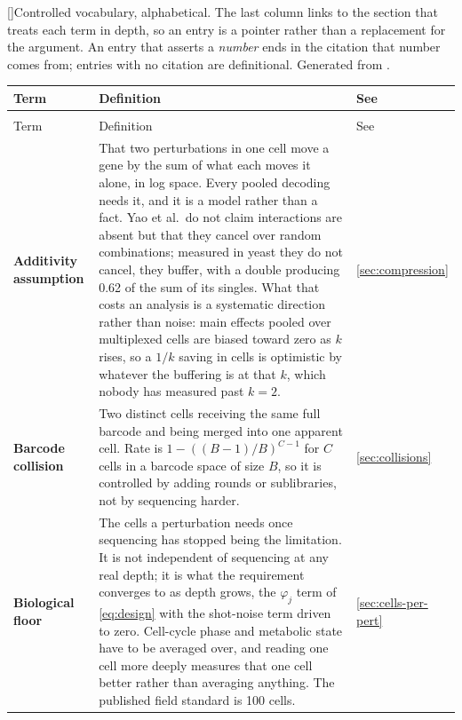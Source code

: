 \begingroup\footnotesize
\setlength{\LTleft}{0pt}\setlength{\LTright}{0pt}
\begingroup\captionsetup{type=table}
[]{Controlled vocabulary, alphabetical. The last column links to the section that treats each term in depth, so an entry is a pointer rather than a replacement for the argument. An entry that asserts a \emph{number} ends in the citation that number comes from; entries with no citation are definitional. Generated from .}\label{tab:glossary}
\endgroup
\begin{longtable}{@{}>{\raggedright\arraybackslash}p{}>{\raggedright\arraybackslash}p{}>{\raggedright\arraybackslash}p{}@{}}
\toprule
Term & Definition & See \\
\midrule
\endfirsthead
\multicolumn{3}{@{}l}{\footnotesize\itshape Table~\ref{tab:glossary}, continued}\\
\toprule
Term & Definition & See \\
\midrule
\endhead
\bottomrule
\endlastfoot
\textbf{Additivity assumption} & That two perturbations in one cell move a gene by the sum of what each moves it alone, in log space. Every pooled decoding needs it, and it is a model rather than a fact. Yao et al.\ do not claim interactions are absent but that they cancel over random combinations; measured in yeast they do not cancel, they buffer, with a double producing 0.62 of the sum of its singles. What that costs an analysis is a systematic direction rather than noise: main effects pooled over multiplexed cells are biased toward zero as $k$ rises, so a $1/k$ saving in cells is optimistic by whatever the buffering is at that $k$, which nobody has measured past $k=2$. & \cref{sec:compression} \\
\addlinespace[5pt]
\textbf{Barcode collision} & Two distinct cells receiving the same full barcode and being merged into one apparent cell. Rate is $1-((B-1)/B)^{C-1}$ for $C$ cells in a barcode space of size $B$, so it is controlled by adding rounds or sublibraries, not by sequencing harder. & \cref{sec:collisions} \\
\addlinespace[5pt]
\textbf{Biological floor} & The cells a perturbation needs once sequencing has stopped being the limitation. It is not independent of sequencing at any real depth; it is what the requirement converges to as depth grows, the $\varphi_j$ term of \cref{eq:design} with the shot-noise term driven to zero. Cell-cycle phase and metabolic state have to be averaged over, and reading one cell more deeply measures that one cell better rather than averaging anything. The published field standard is 100 cells.~\citep{brandnerPooledSinglecellCRISPRa2025} & \cref{sec:cells-per-pert} \\

\end{longtable}
